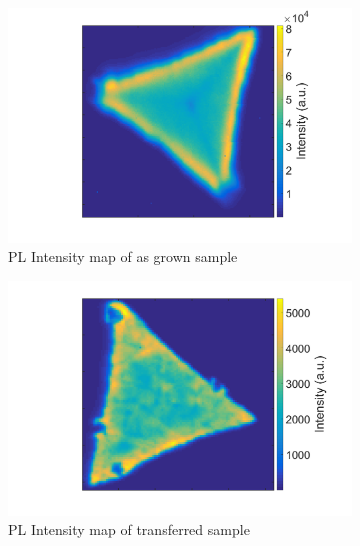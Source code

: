 \begin{figure}[ht] %
	\begin{center}
		\begin{subfigure}[b]{0.4\textwidth}
			\includegraphics[scale=0.15]{Transfer/TransferPLIntensityMapAsgrown.png}
			\caption{PL Intensity map of as grown sample}
			\label{fig:TransferPLIntensityMapAsgrown}
		\end{subfigure}
		\quad
		\begin{subfigure}[b]{0.4\textwidth}
			\includegraphics[scale=0.15]{Transfer/TransferPLIntensityMapTransferred.png}
			\caption{PL Intensity map of transferred sample}
			\label{fig:TransferPLIntensityMapTransferred}
		\end{subfigure}
		\vfill
		\begin{subfigure}[b]{0.4\textwidth}

\end{subfigure}
\end{center}
\end{figure}
